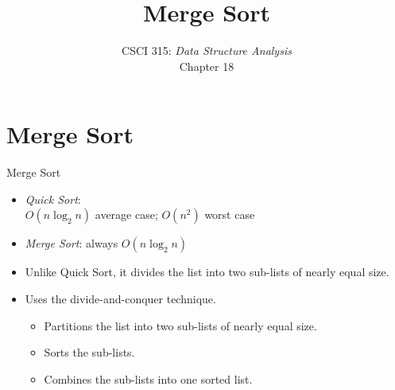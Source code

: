 \documentclass[14pt,aspectratio=1610]{beamer}
\title{\Huge{} Merge Sort}
\subtitle{CSCI 315: \textit{Data Structure Analysis}\\Chapter 18}
\institute{Charleston Southern University}
\begin{document}
\begin{frame}
  \titlepage%
\end{frame}

\section{Merge Sort}
\begin{frame}{Merge Sort}
\begin{itemize}\setlength\itemsep{0.5em}
\item
  \emph{Quick Sort}:\\
    \(O(n\log_2n)\) average case; \(O(n^2)\) worst case
\item
  \emph{Merge Sort}: always \(O(n\log_2n)\)

\item
  Unlike Quick Sort, it divides the list into two sub-lists of nearly equal size.
\item
  Uses the divide-and-conquer technique.
  \begin{itemize}
  \item
    Partitions the list into two sub-lists of nearly equal size.
  \item
    Sorts the sub-lists.
  \item
    Combines the sub-lists into one sorted list.
  \end{itemize}

\end{itemize}
\end{frame}
\end{document}
